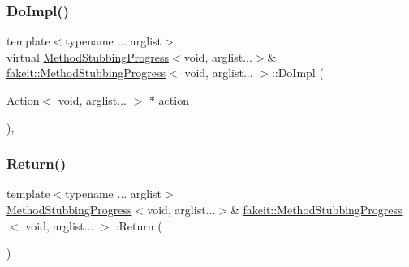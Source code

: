 \mbox{\label{structfakeit_1_1MethodStubbingProgress_3_01void_00_01arglist_8_8_8_01_4_a14b0b058c37c9539550e6d17395e1e60}} 
\subsubsection{\texorpdfstring{DoImpl()}{DoImpl()}\hspace{0.1cm}{\footnotesize\ttfamily [9/9]}}
{\footnotesize\ttfamily template$<$typename ... arglist$>$ \\
virtual \mbox{\hyperlink{structfakeit_1_1MethodStubbingProgress}{Method\+Stubbing\+Progress}}$<$void, arglist...$>$\& \mbox{\hyperlink{structfakeit_1_1MethodStubbingProgress}{fakeit\+::\+Method\+Stubbing\+Progress}}$<$ void, arglist... $>$\+::Do\+Impl (\begin{DoxyParamCaption}\item[{\mbox{\hyperlink{structfakeit_1_1Action}{Action}}$<$ void, arglist... $>$ $\ast$}]{action }\end{DoxyParamCaption})\hspace{0.3cm}{\ttfamily [protected]}, {}}

\mbox{\label{structfakeit_1_1MethodStubbingProgress_3_01void_00_01arglist_8_8_8_01_4_ada79edce54db3ffaa88985829f9b5558}} 
\subsubsection{\texorpdfstring{Return()}{Return()}\hspace{0.1cm}{\footnotesize\ttfamily [1/18]}}
{\footnotesize\ttfamily template$<$typename ... arglist$>$ \\
\mbox{\hyperlink{structfakeit_1_1MethodStubbingProgress}{Method\+Stubbing\+Progress}}$<$void, arglist...$>$\& \mbox{\hyperlink{structfakeit_1_1MethodStubbingProgress}{fakeit\+::\+Method\+Stubbing\+Progress}}$<$ void, arglist... $>$\+::Return (\begin{DoxyParamCaption}{ }\end{DoxyParamCaption})\hspace{0.3cm}{\ttfamily [inline]}}

